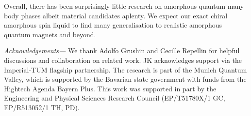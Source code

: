 \documentclass[%
 reprint,
superscriptaddress,
 amsmath,amssymb,
aps,
]{revtex4-2}
\begin{document}
Overall, there has been surprisingly little research on amorphous quantum many body phases albeit material candidates aplenty. We expect our exact chiral amorphous spin liquid to find many generalisation to realistic amorphous quantum magnets and beyond. 


\vspace{0.3cm}
{\it Acknowledgements--- } 
We thank Adolfo Grushin and Cecille Repellin for helpful discussions and collaboration on related work. 
JK acknowledges support via the Imperial-TUM flagship partnership. The research is part of the Munich Quantum Valley, which is supported by the Bavarian state government with funds from the Hightech Agenda Bayern Plus. This work was supported in part by the Engineering and Physical Sciences Research Council (EP/T51780X/1 GC, EP/R513052/1 TH, PD).

\nocite{Karp1972,imms-sat18, koala}


\end{document}
